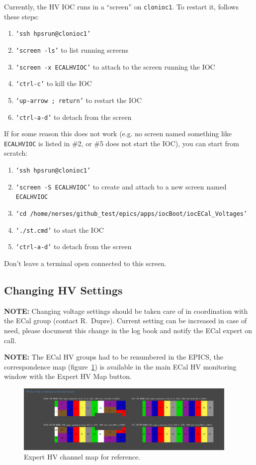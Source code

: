 \documentclass[12pt]{article}
\begin{document}
   Currently, the HV IOC runs in a ``screen'' on \texttt{clonioc1}.  To restart it, follows these steps:
   {\footnotesize
   \begin{enumerate}
       \item \texttt{`ssh hpsrun@clonioc1'}
       \item \texttt{`screen -ls'} to list running screens
       \item \texttt{`screen -x ECALHVIOC'} to attach to the screen running the IOC
       \item \texttt{`ctrl-c'} to kill the IOC
       \item \texttt{`up-arrow ; return'} to restart the IOC
       \item \texttt{`ctrl-a-d'} to detach from the screen
   \end{enumerate}
   }
   If for some reason this does not work (e.g. no screen named something like \texttt{ECALHVIOC} is listed in \#2, or \#5 does not start the IOC), you can start from scratch:
   {\footnotesize
   \begin{enumerate}
       \item \texttt{`ssh hpsrun@clonioc1'}
       \item \texttt{`screen -S ECALHVIOC'} to create and attach to a new screen named \texttt{ECALHVIOC}
       \item \texttt{`cd /home/nerses/github\_test/epics/apps/iocBoot/iocECal\_Voltages'}
       \item \texttt{`./st.cmd'} to start the IOC
       \item \texttt{`ctrl-a-d'} to detach from the screen
   \end{enumerate}
   }
   Don't leave a terminal open connected to this screen.
   \subsection{Changing HV Settings}
      {\bf NOTE:} Changing voltage settings should be taken care of in coordination with the ECal group (contact R.~Dupre). Current setting can be increased in case of need, please document this change in the log book and notify the ECal expert on call.

 {\bf NOTE:} The ECal HV groups had to be renumbered in the EPICS, the correspondence map (figure~\ref{ExpertMap}) is available in the main ECal HV monitoring window with the Expert HV Map button.

\begin{figure}[htbp]
\center
\includegraphics[width=0.95\textwidth]{pics/ecalhv_expertmap_2014_12_15.png}
\caption{\small \label{ExpertMap} Expert HV channel map for reference.}
\end{figure}
\end{document}
